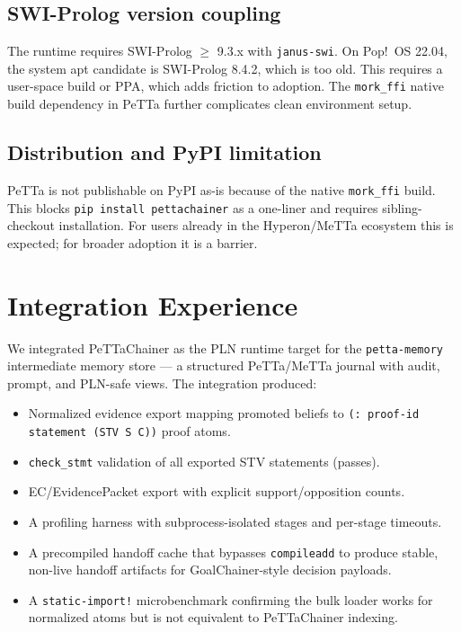 \documentclass[11pt]{article}
\begin{document}
\subsection{SWI-Prolog version coupling}

The runtime requires SWI-Prolog $\geq$ 9.3.x with \texttt{janus-swi}. On
Pop!~OS 22.04, the system apt candidate is SWI-Prolog 8.4.2, which is too old.
This requires a user-space build or PPA, which adds friction to adoption. The
\texttt{mork\_ffi} native build dependency in PeTTa further complicates clean
environment setup.

\subsection{Distribution and PyPI limitation}

PeTTa is not publishable on PyPI as-is because of the native \texttt{mork\_ffi}
build. This blocks \texttt{pip install pettachainer} as a one-liner and requires
sibling-checkout installation. For users already in the Hyperon/MeTTa ecosystem
this is expected; for broader adoption it is a barrier.


\section{Integration Experience}

We integrated PeTTaChainer as the PLN runtime target for the \texttt{petta-memory}
intermediate memory store --- a structured PeTTa/MeTTa journal with audit, prompt,
and PLN-safe views. The integration produced:

\begin{itemize}[nosep]
  \item Normalized evidence export mapping promoted beliefs to
  \texttt{(: proof-id statement (STV S C))} proof atoms.
  \item \texttt{check\_stmt} validation of all exported STV statements (passes).
  \item EC/EvidencePacket export with explicit support/opposition counts.
  \item A profiling harness with subprocess-isolated stages and per-stage
  timeouts.
  \item A precompiled handoff cache that bypasses \texttt{compileadd} to produce
  stable, non-live handoff artifacts for GoalChainer-style decision payloads.
  \item A \texttt{static-import!} microbenchmark confirming the bulk loader works
  for normalized atoms but is not equivalent to PeTTaChainer indexing.
\end{itemize}
\end{document}
